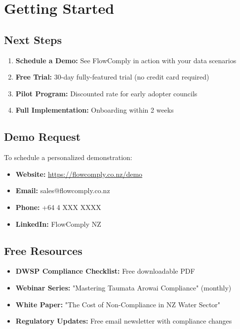 \documentclass[11pt,a4paper]{article}
\begin{document}
\section{Getting Started}

\subsection{Next Steps}

\begin{enumerate}[leftmargin=*, itemsep=0.5em]
    \item \textbf{Schedule a Demo:} See FlowComply in action with your data scenarios
    \item \textbf{Free Trial:} 30-day fully-featured trial (no credit card required)
    \item \textbf{Pilot Program:} Discounted rate for early adopter councils
    \item \textbf{Full Implementation:} Onboarding within 2 weeks
\end{enumerate}

\subsection{Demo Request}

To schedule a personalized demonstration:

\begin{itemize}[leftmargin=*]
    \item \textbf{Website:} \url{https://flowcomply.co.nz/demo}
    \item \textbf{Email:} sales@flowcomply.co.nz
    \item \textbf{Phone:} +64 4 XXX XXXX
    \item \textbf{LinkedIn:} FlowComply NZ
\end{itemize}

\subsection{Free Resources}

\begin{itemize}[leftmargin=*, itemsep=0.3em]
    \item \textbf{DWSP Compliance Checklist:} Free downloadable PDF
    \item \textbf{Webinar Series:} "Mastering Taumata Arowai Compliance" (monthly)
    \item \textbf{White Paper:} "The Cost of Non-Compliance in NZ Water Sector"
    \item \textbf{Regulatory Updates:} Free email newsletter with compliance changes
\end{itemize}
\end{document}
